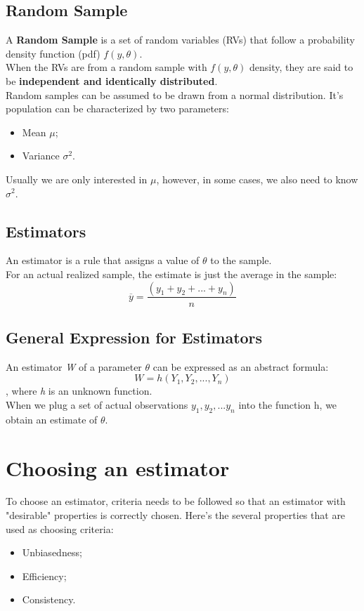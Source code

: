 \documentclass[11pt,a4paper]{report}
\begin{document}
\subsection{Random Sample}
A \textbf{Random Sample} is a set of random variables (RVs) that follow a probability density function (pdf) $f(y,\theta)$.
\\When the RVs are from a random sample with $f(y,\theta)$ density, they are said to be \textbf{independent and identically distributed}.
\\Random samples can be assumed to be drawn from a normal distribution. It's population can be characterized by two parameters:
\begin{itemize}
    \item Mean $\mu$;
    \item Variance $\sigma^2$.
\end{itemize}
Usually we are only interested in $\mu$, however, in some cases, we also need to know $\sigma^2$.
\subsection{Estimators}
An estimator is a rule that assigns a value of $\theta$ to the sample.
\\For an actual realized sample, the estimate is just the average in the sample:
\[\overline{y} = \frac{(y_1 + y_2 + ... + y_n)}{n}\]

\subsection{General Expression for Estimators}
An estimator \textit{W} of a parameter $\theta$ can be expressed as an abstract formula:
\[W = h(Y_1, Y_2, ..., Y_n)\], where \textit{h} is an unknown function.
\\When we plug a set of actual observations ${y_1, y_2, ... y_n}$ into the function h, we obtain an estimate of $\theta$.

\section{Choosing an estimator}
To choose an estimator, criteria needs to be followed so that an estimator with "desirable" properties is correctly chosen. Here's the several properties that are used as choosing criteria:
\begin{itemize}
    \item Unbiasedness;
    \item Efficiency;
    \item Consistency.
\end{itemize}
\end{document}
